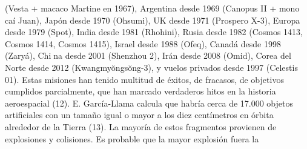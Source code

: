 \documentclass[12pt,letterpaper]{article}
\begin{document}
\begin{multicols}{2}
 (Vesta + macaco Martine en 1967), Argentina desde 1969 (Canopus II + mono caí Juan), Japón desde 1970 (Ohsumi), UK desde 1971 (Prospero X-3), Europa desde 1979 (Spot), India desde 1981 (Rhohini), Rusia desde 1982 (Cosmos 1413, Cosmos 1414, Cosmos 1415), Israel desde 1988 (Ofeq), Canadá desde 1998 (Zaryá), China desde 2001 (Shenzhou 2), Irán desde 2008 (Omid), Corea del Norte desde 2012 (Kwangmyŏngsŏng-3), y vuelos privados desde 1997 (Celestis 01). Estas misiones han tenido multitud de éxitos, de fracasos, de objetivos cumplidos parcialmente, que han marcado verdaderos hitos en la historia aeroespacial (12). E. García-Llama calcula que habría cerca de 17.000 objetos artificiales con un tamaño igual o mayor a los diez centímetros en órbita alrededor de la Tierra (13). La mayoría de estos fragmentos provienen de explosiones y colisiones. Es probable que la mayor explosión fuera la 
\end{multicols}
\newpage

\pagestyle{fancy}
        \fancyhf{}
        \rhead{}
  
\end{document}
